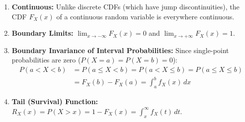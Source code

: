 \documentclass[12pt,a4paper]{article}
\begin{document}
\begin{tcolorbox}[formulabox, title={\textbf{Key Properties of Continuous CDF and Interval Probabilities}}]
\begin{enumerate}[leftmargin=*, itemsep=3pt]
  \item \textbf{Continuous:} Unlike discrete CDFs (which have jump discontinuities), the CDF $F_X(x)$ of a continuous random variable is everywhere continuous.
  \item \textbf{Boundary Limits:} $\displaystyle\lim_{x \to -\infty} F_X(x) = 0$ and $\displaystyle\lim_{x \to +\infty} F_X(x) = 1$.
  \item \textbf{Boundary Invariance of Interval Probabilities:} Since single-point probabilities are zero ($P(X = a) = P(X = b) = 0$):
  \begin{align}
    P(a < X < b) &= P(a \le X < b) = P(a < X \le b) = P(a \le X \le b) \nonumber \\[2pt]
                 &= F_X(b) - F_X(a) = \int_a^b f_X(x) \, dx
  \end{align}
  \item \textbf{Tail (Survival) Function:} $R_X(x) = P(X > x) = 1 - F_X(x) = \int_x^\infty f_X(t) \, dt$.
\end{enumerate}
\end{tcolorbox}
\end{document}
